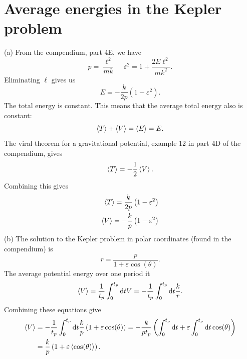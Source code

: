 \documentclass{article}
\begin{document}
    \section{Average energies in the Kepler problem}
        (a) From the compendium, part 4E, we have 
        \begin{equation*}
            p = \frac{\ell^2}{m k}\, \quad \varepsilon^2 = 1 + \frac{2 E \ell^2}{m k^2}.
        \end{equation*}
        Eliminating $\ell$ gives us 
        \begin{equation*}
            E = - \frac{k}{2 p} \left(1 - \varepsilon^2\right).
        \end{equation*}
        The total energy is constant. This means that the average total energy also is constant:
        \begin{equation*}
            \expval{T} + \expval{V} = \expval{E} = E.
        \end{equation*}
        The viral theorem for a gravitational potential, example 12 in part 4D of the compendium, gives
        \begin{equation*}
            \expval{T} = - \frac{1}{2} \expval{V}.
        \end{equation*}
        Combining this gives
        \begin{align*}
            \expval{T} = \frac{k}{2 p} \left(1 - \varepsilon^2\right) \\
            \expval{V} = - \frac{k}{p} \left(1 - \varepsilon^2\right)
        \end{align*}
        (b) The solution to the Kepler problem in polar coordinates (found in the compendium) is 
        \begin{equation*}
            r = \frac{p}{1 + \varepsilon \cos(\theta)}.
        \end{equation*}
        The average potential energy over one period it
        \begin{equation*}
            \expval{V} = \frac{1}{t_p} \int_0^{t_p} \dd t V = -\frac{1}{t_p} \int_0^{t_p} \dd t \frac{k}{r}.
        \end{equation*}
        Combining these equations give
        \begin{align*}
            \expval{V} &= - \frac{1}{t_p}  \int_0^{t_p} \dd t \frac{k}{p} \left(1 + \varepsilon \cos(\theta)\right) = - \frac{k}{p t_p} \left(\int_0^{t_p} \dd t + \varepsilon \int_0^{t_p} \dd t\cos(\theta)\right) \\
            & = \frac{k}{p} \left(1 + \varepsilon\expval{\cos(\theta)}\right).
        \end{align*}
\end{document}
